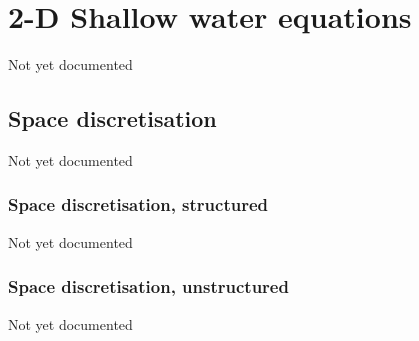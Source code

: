 \documentclass[subfooter]{mooiman_report}
\newcommand{\notyet}{Not yet documented\xspace}
\begin{document}
\chapter{2-D Shallow water equations}
\notyet
\section{Space discretisation}
\notyet
\subsection{Space discretisation, structured}
\notyet
\subsection{Space discretisation, unstructured}
\notyet
\printallbibliography
\appendix



\end{document}
